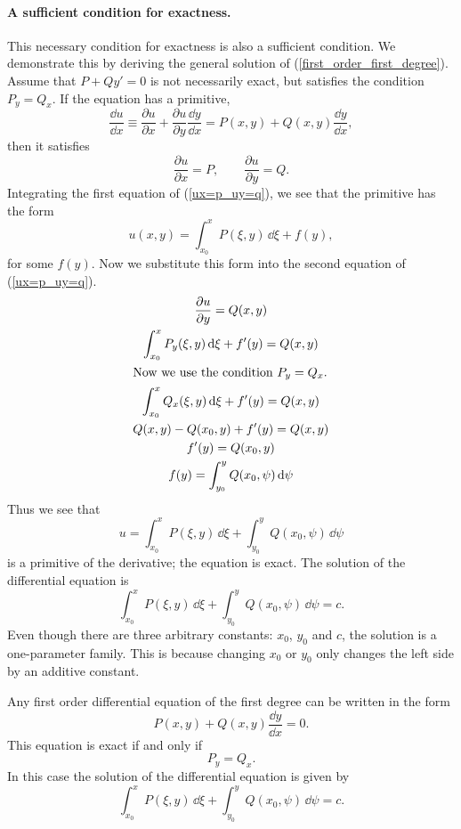 \paragraph{A sufficient condition for exactness.}
This necessary condition for exactness is also a sufficient condition.
We demonstrate this by deriving the general solution of 
(\ref{first_order_first_degree}).  Assume that $P + Q y' = 0$
is not necessarily exact, but satisfies the condition $P_y = Q_x$.
If the equation has a primitive, 
\[
\frac{\dd u}{\dd x} \equiv \frac{\partial u}{\partial x} + \frac{\partial u}{\partial y} \frac{\dd y}{\dd x}
= P(x, y) + Q(x, y) \frac{\dd y}{\dd x},
\]
then it satisfies
\begin{equation}
  \label{ux=p_uy=q}
  \frac{\partial u}{\partial x} = P, \qquad \frac{\partial u}{\partial y} = Q.
\end{equation}
Integrating the first equation of (\ref{ux=p_uy=q}), we see that the 
primitive has the form
\[
u(x, y) = \int_{x_0}^x P(\xi, y) \,\dd \xi + f(y),
\]
for some $f(y)$.
Now we substitute this form into the second equation of (\ref{ux=p_uy=q}).
\begin{gather*}
  \frac{\partial u}{\partial y} = Q(x, y) \\
  \int_{x_0}^x P_y(\xi, y) \,\mathrm{d} \xi + f'(y) = Q(x, y) \\
  \intertext{Now we use the condition $P_y = Q_x$.}
  \int_{x_0}^x Q_x(\xi, y) \,\mathrm{d} \xi + f'(y) = Q(x, y) \\
  Q(x,y) - Q(x_0, y) + f'(y) = Q(x, y) \\
  f'(y) = Q(x_0, y) \\
  f(y) = \int_{y_0}^y Q(x_0, \psi) \,\mathrm{d} \psi
\end{gather*}
Thus we see that 
\[
u = \int_{x_0}^x P(\xi, y) \,\dd \xi + \int_{y_0}^y Q(x_0, \psi) \,\dd \psi
\]
is a primitive of the derivative; the equation is exact.  The solution of
the differential equation is
\[
\int_{x_0}^x P(\xi, y) \,\dd \xi + \int_{y_0}^y Q(x_0, \psi) \,\dd \psi = c.
\]
Even though there are three arbitrary constants: $x_0$, $y_0$ and $c$, 
the solution is a one-parameter family.  This is because changing 
$x_0$ or $y_0$ only changes the left side by an additive constant.




\begin{Result}
  Any first order differential equation of the first degree can be written
  in the form
  \[
  P(x, y) + Q(x, y) \frac{\dd y}{\dd x} = 0.
  \]
  This equation is exact if and only if
  \[
  P_y = Q_x.
  \]
  In this case the solution of the differential equation is given by
  \[
  \int_{x_0}^x P(\xi, y) \,\dd \xi 
  + \int_{y_0}^y Q(x_0, \psi) \,\dd \psi = c.
  \]
\end{Result}





